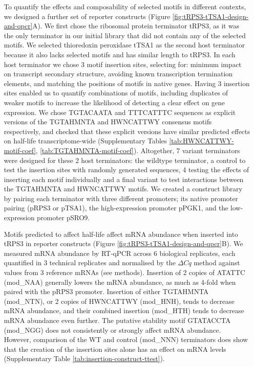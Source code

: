 \documentclass{SBCbookchapter}
\begin{document}
To quantify the effects and composability of selected motifs in different contexts, we designed a further set of reporter constructs (Figure \ref{fig:tRPS3-tTSA1-design-and-qpcr}A).
We first chose the ribosomal protein terminator tRPS3, as it was the only terminator in our initial library that did not contain any of the selected motifs.
We selected thioredoxin peroxidase tTSA1 as the second host terminator because it also lacks selected motifs and has similar length to tRPS3.
In each host terminator we chose 3 motif insertion sites, selecting for: minimum impact on transcript secondary structure, avoiding known transcription termination elements, and matching the positions of motifs in native genes.
Having 3 insertion sites enabled us to quantify combinations of motifs, including duplicates of weaker motifs to increase the likelihood of detecting a clear effect on gene expression.
We chose TGTACAATA and TTTCATTTC sequences as explicit versions of the TGTAHMNTA and HWNCATTWY consensus motifs respectively, and checked that these explicit versions have similar predicted effects on half-life transcriptome-wide (Supplementary Tables \ref{tab:HWNCATTWY-motif-coef}, \ref{tab:TGTAHMNTA-motif-coef}).
Altogether, 7 variant terminators were designed for these 2 host terminators: the wildtype terminator, a control to test the insertion sites with randomly generated sequences, 4 testing the effects of inserting each motif individually and a final variant to test interactions between the TGTAHMNTA and HWNCATTWY motifs.
We created a construct library by pairing each terminator with three different promoters; its native promoter pairing (pRPS3 or pTSA1), the high-expression promoter pPGK1, and the low-expression promoter pSRO9.

Motifs predicted to affect half-life affect mRNA abundance when inserted into tRPS3 in reporter constructs (Figure \ref{fig:tRPS3-tTSA1-design-and-qpcr}B).
We measured mRNA abundance by RT-qPCR across 6 biological replicates, each quantified in 3 technical replicates and normalised by the \(\Delta Cq\) method against values from 3 reference mRNAs (see methods).
Insertion of 2 copies of ATATTC (mod\_NAA) generally lowers the mRNA abundance, as much as 4-fold when paired with the pRPS3 promoter.
Insertion of either TGTAHMNTA (mod\_NTN), or 2 copies of HWNCATTWY (mod\_HNH), tends to decrease mRNA abundance, and their combined insertion (mod\_HTH) tends to decrease mRNA abundance even further.
The putative stability motif GTATACCTA (mod\_NGG) does not consistently or strongly affect mRNA abundance.
However, comparison of the WT and control (mod\_NNN) terminators does show that the creation of the insertion sites alone has an effect on mRNA levels (Supplementary Table \ref{tab:insertion-construct-ttest}).
\end{document}
